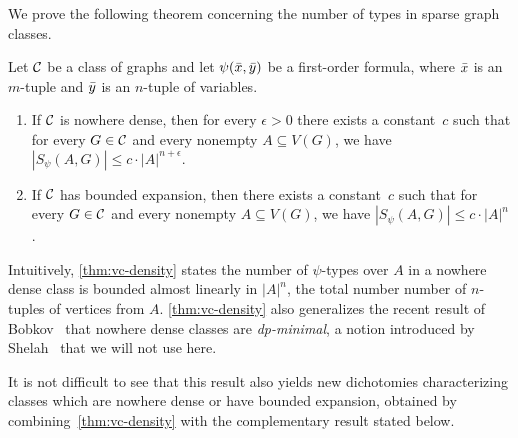 We prove the following theorem concerning the number of
types in sparse graph classes.

\begin{theorem}\label{thm:vc-density}
Let $\mathcal{C}$ be a class of graphs and let $\psi(\bar{x},\bar{y})$ be a first-order formula, where 
$\bar{x}$ is an $m$-tuple and $\bar{y}$ is an $n$-tuple of variables. 
\begin{enumerate}
\item If $\mathcal{C}$ is nowhere dense, then for every $\epsilon>0$ 
there exists a constant~$c$ such that for every $G\in \mathcal{C}$ and every nonempty
$A\subseteq V(G)$, we have $|S_\psi(A,G)|\leq c\cdot |A|^{n+\epsilon}.$

\item If $\mathcal{C}$ has bounded expansion, then there exists a constant~$c$ such that for every $G\in \mathcal{C}$ and every nonempty $A\subseteq V(G)$, we have $|S_\psi(A,G)|\leq c\cdot |A|^n$.
\end{enumerate}
\end{theorem}

Intuitively, \cref{thm:vc-density} states the number
of $\psi$-types over $A$ in a nowhere dense class 
is bounded almost linearly in $|A|^n$, the total number number of $n$-tuples of vertices from $A$. 
\cref{thm:vc-density} also generalizes the recent result of Bobkov~\cite{bobkov2017computations} that nowhere dense classes
are {\em{dp-minimal}}, a notion introduced by Shelah~\cite{shelah2014strongly} that we will not use here.



%
%
%
%
%
%
It is not difficult to see that this result also yields new dichotomies 
characterizing classes which are nowhere dense  or have bounded expansion, obtained by combining~\cref{thm:vc-density}
with the complementary result stated below.

